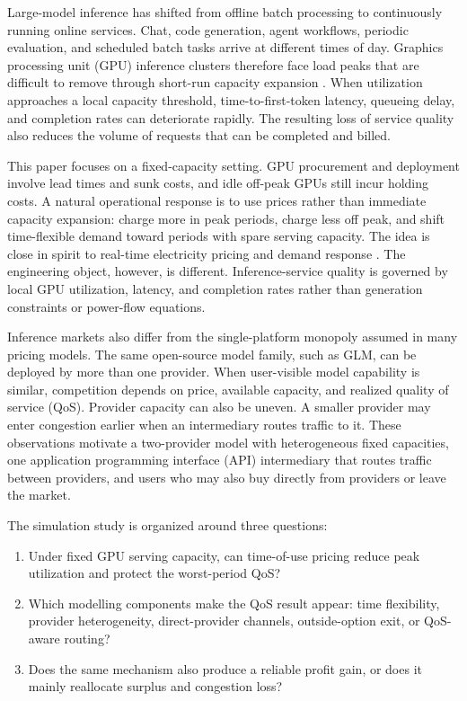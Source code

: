 \documentclass[11pt,a4paper]{article}
\begin{document}
Large-model inference has shifted from offline batch processing to continuously running online services. Chat, code generation, agent workflows, periodic evaluation, and scheduled batch tasks arrive at different times of day. Graphics processing unit (GPU) inference clusters therefore face load peaks that are difficult to remove through short-run capacity expansion \cite{crankshaw2017clipper,gujarati2020clockwork,yu2022orca,kwon2023pagedattention,agrawal2024sarathiserve}. When utilization approaches a local capacity threshold, time-to-first-token latency, queueing delay, and completion rates can deteriorate rapidly. The resulting loss of service quality also reduces the volume of requests that can be completed and billed.

This paper focuses on a fixed-capacity setting. GPU procurement and deployment involve lead times and sunk costs, and idle off-peak GPUs still incur holding costs. A natural operational response is to use prices rather than immediate capacity expansion: charge more in peak periods, charge less off peak, and shift time-flexible demand toward periods with spare serving capacity. The idea is close in spirit to real-time electricity pricing and demand response \cite{schweppe1988spot,borenstein2005long,albadi2008summary,faruqui2010household,siano2014demand}. The engineering object, however, is different. Inference-service quality is governed by local GPU utilization, latency, and completion rates rather than generation constraints or power-flow equations.

Inference markets also differ from the single-platform monopoly assumed in many pricing models. The same open-source model family, such as GLM, can be deployed by more than one provider. When user-visible model capability is similar, competition depends on price, available capacity, and realized quality of service (QoS). Provider capacity can also be uneven. A smaller provider may enter congestion earlier when an intermediary routes traffic to it. These observations motivate a two-provider model with heterogeneous fixed capacities, one application programming interface (API) intermediary that routes traffic between providers, and users who may also buy directly from providers or leave the market.

The simulation study is organized around three questions:
\begin{enumerate}[label=\textbf{RQ\arabic*.},leftmargin=2.8em]
  \item Under fixed GPU serving capacity, can time-of-use pricing reduce peak utilization and protect the worst-period QoS?
  \item Which modelling components make the QoS result appear: time flexibility, provider heterogeneity, direct-provider channels, outside-option exit, or QoS-aware routing?
  \item Does the same mechanism also produce a reliable profit gain, or does it mainly reallocate surplus and congestion loss?
\end{enumerate}
\end{document}
